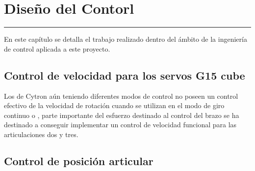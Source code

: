 \chapter{Diseño del Contorl} \label{chap:Control}
\hrule
\vspace{3mm}
En este capítulo se detalla el trabajo realizado dentro del ámbito de la ingeniería de control aplicada a este proyecto.

\section{Control de velocidad para los servos G15 cube} \label{sec:Control:velocidad_g15}

Los  de Cytron aún teniendo diferentes modos de control no poseen un control efectivo de la velocidad de rotación cuando se utilizan en el modo de giro continuo o , parte importante del esfuerzo destinado al control del brazo se ha destinado a conseguir implementar un control de velocidad funcional para las articulaciones dos y tres.

\section{Control de posición articular} \label{sec:Contorl:posicion_articular}
